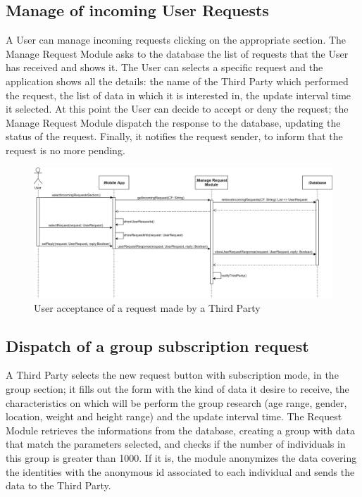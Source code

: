 \subsection{Manage of incoming User Requests}
A User can manage incoming requests clicking on the appropriate section. The Manage Request Module asks to the database the list of requests that the User has received and shows it. The User can selects a specific request and the application shows all the details:
the name of the Third Party which performed the request, the list of data in which it is interested in, the update interval time it selected. At this point the User can decide to accept or deny the request; the Manage Request Module dispatch the response to the database, updating the status of the request. Finally, it notifies the request sender, to inform that the request is no more pending. 

\begin{figure}[H]

    \centering
    \includegraphics[scale=0.14]{./Pictures/acceptRequest.png}
    \caption{User acceptance of a request made by a Third Party}
    
\end{figure}

\subsection{Dispatch of a group subscription request}
A Third Party selects the new request button with subscription mode, in the group section; it fills out the form with the kind of data it desire to receive, the characteristics on which will be perform the group research (age range, gender, location, weight and height range) and the update interval time. The Request Module retrieves the informations from the database, creating a group with data that match the parameters selected, and checks if the number of individuals in this group is greater than 1000. If it is, the module anonymizes the data covering the identities with the anonymous id associated to each individual and sends the data to the Third Party.

